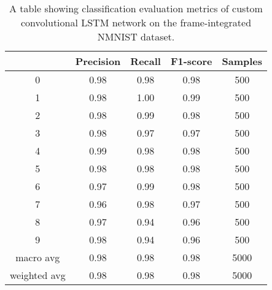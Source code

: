 \begin{table}[htb]
    \centering
    \begin{tabular}{|| c | c | c | c | c ||}
        \hline
             & Precision & Recall & F1-score & Samples \\
        \hline \hline
        0            & 0.98 & 0.98 & 0.98 & 500  \\
        \hline
        1            & 0.98 & 1.00 & 0.99 & 500  \\
        \hline
        2            & 0.98 & 0.99 & 0.98 & 500  \\
        \hline
        3            & 0.98 & 0.97 & 0.97 & 500  \\
        \hline
        4            & 0.99 & 0.98 & 0.98 & 500  \\
        \hline
        5            & 0.98 & 0.98 & 0.98 & 500  \\
        \hline
        6            & 0.97 & 0.99 & 0.98 & 500  \\
        \hline
        7            & 0.96 & 0.98 & 0.97 & 500  \\
        \hline
        8            & 0.97 & 0.94 & 0.96 & 500  \\
        \hline
        9            & 0.98 & 0.94 & 0.96 & 500  \\
        \hline
        macro avg    & 0.98 & 0.98 & 0.98 & 5000 \\
        \hline
        weighted avg & 0.98 & 0.98 & 0.98 & 5000 \\
        \hline
    \end{tabular}
    \caption{A table showing classification evaluation metrics of custom convolutional LSTM network on the frame-integrated NMNIST dataset.}
    \label{tab:custom_conv_lstm_nmnist_evaluation_metrics}
\end{table}


